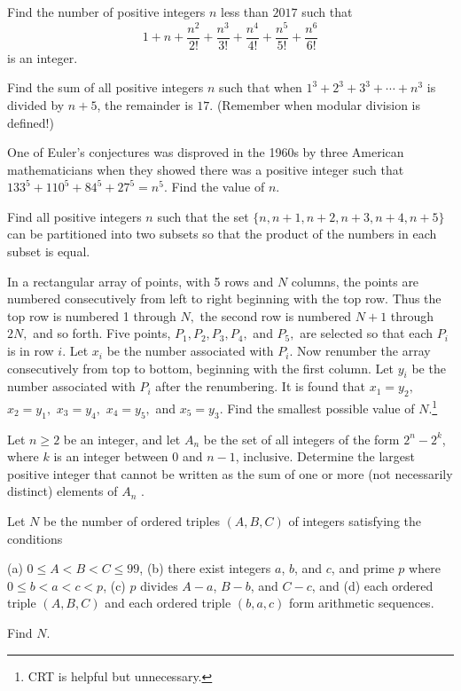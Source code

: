 \documentclass[mast]{lucky}
\begin{document}
\begin{prob}[AIME II 2017/8]{6}
Find the number of positive integers $n$ less than $2017$ such that
\[ 1+n+\frac{n^2}{2!}+\frac{n^3}{3!}+\frac{n^4}{4!}+\frac{n^5}{5!}+\frac{n^6}{6!} \]is an integer.
\end{prob}

\begin{prob}[AOIME 2020/10]{6}
Find the sum of all positive integers $n$ such that when $1^3+2^3+3^3+\cdots+n^3$ is divided by $n+5$, the remainder is $17.$ (Remember when modular division is defined!)
\end{prob}

\begin{req}[AIME 1989/9]{9}
One of Euler's conjectures was disproved in the 1960s by three American mathematicians when they showed there was a positive integer such that $133^5+110^5+84^5+27^5=n^{5}$. Find the value of $n$.
\end{req}

\begin{prob}[IMO 1970/4]{9}
Find all positive integers $n$ such that the set $\{n,n+1,n+2,n+3,n+4,n+5\}$ can be partitioned into two subsets so that the product of the numbers in each subset is equal.
\end{prob}

\begin{prob}[AIME I 2001/11]{9}
In a rectangular array of points, with 5 rows and $N$ columns, the points are numbered consecutively from left to right beginning with the top row. Thus the top row is numbered 1 through $N,$ the second row is numbered $N+1$ through $2N,$ and so forth. Five points, $P_1, P_2, P_3, P_4,$ and $P_5,$ are selected so that each $P_i$ is in row $i.$ Let $x_i$ be the number associated with $P_i.$ Now renumber the array consecutively from top to bottom, beginning with the first column. Let $y_i$ be the number associated with $P_i$ after the renumbering. It is found that $x_1=y_2,$ $x_2=y_1,$ $x_3=y_4,$ $x_4=y_5,$ and $x_5=y_3.$ Find the smallest possible value of $N.$\footnote{CRT is helpful but unnecessary.}
\end{prob}
    
\begin{prob}[ISL 2014/N1]{13}
Let $n \ge 2$ be an integer, and let $A_n$ be the set of all integers of the form $2^n-2^k$, where $k$ is an integer between $0$ and $n-1$, inclusive. Determine the largest positive integer that cannot be written as the sum of one or more (not necessarily distinct) elements of $A_n$ .
\end{prob}

\begin{prob}[AIME I 2013/15]{13}
Let $N$ be the number of ordered triples $(A,B,C)$ of integers satisfying the conditions

(a) $0\leq A<B<C\leq99$,
(b) there exist integers $a$, $b$, and $c$, and prime $p$ where $0\leq b < a < c < p$,
(c) $p$ divides $A-a$, $B-b$, and $C-c$, and
(d) each ordered triple $(A,B,C)$ and each ordered triple $(b,a,c)$ form arithmetic sequences.

Find $N$.
\end{prob}
\end{document}

